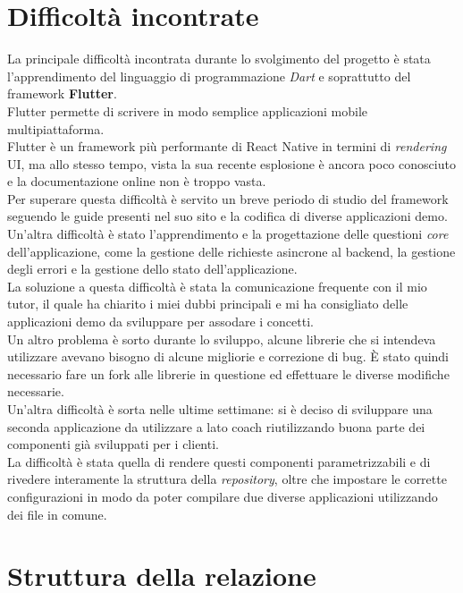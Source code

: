 \section{Difficoltà incontrate}
La principale difficoltà incontrata durante lo svolgimento del progetto è stata l'apprendimento del linguaggio di programmazione \textit{Dart} e soprattutto del framework \textbf{Flutter}.\\
Flutter permette di scrivere in modo semplice applicazioni mobile multipiattaforma.\\
Flutter è un framework più performante di React Native in termini di \textit{rendering} UI, ma allo stesso tempo, vista la sua recente esplosione è ancora poco conosciuto e la documentazione online non è troppo vasta.\\ 
Per superare questa difficoltà è servito un breve periodo di studio del framework seguendo le guide presenti nel suo sito e la codifica di diverse applicazioni demo.\\
Un'altra difficoltà è stato l'apprendimento e la progettazione delle questioni \textit{core} dell'applicazione, come la gestione delle richieste asincrone al backend, la gestione degli errori e la gestione dello stato dell'applicazione.\\
La soluzione a questa difficoltà è stata la comunicazione frequente con il mio tutor, il quale ha chiarito i miei dubbi principali e mi ha consigliato delle applicazioni demo da sviluppare per assodare i concetti.\\
Un altro problema è sorto durante lo sviluppo, alcune librerie che si intendeva utilizzare avevano bisogno di alcune migliorie e correzione di bug. È stato quindi necessario fare un \gls{fork} alle librerie in questione ed effettuare le diverse modifiche necessarie.\\
Un'altra difficoltà è sorta nelle ultime settimane: si è deciso di sviluppare una seconda applicazione da utilizzare a lato coach riutilizzando buona parte dei componenti già sviluppati per i clienti.\\
La difficoltà è stata quella di rendere questi componenti parametrizzabili e di rivedere interamente la struttura della \textit{repository}, oltre che impostare le corrette configurazioni in modo da poter compilare due diverse applicazioni utilizzando dei file in comune.

\section{Struttura della relazione}

